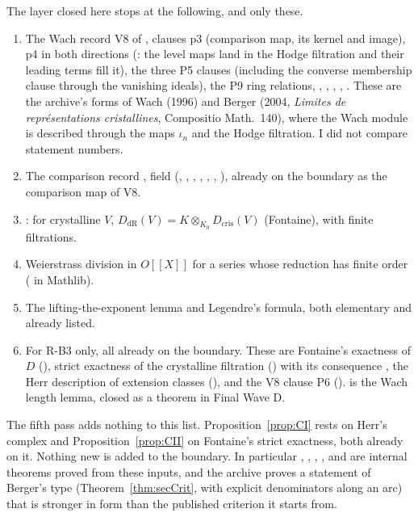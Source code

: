 \documentclass[11pt]{article}
\theoremstyle{definition}
\theoremstyle{remark}
\begin{document}
The layer closed here stops at the following, and only these.
\begin{enumerate}[leftmargin=*,itemsep=1pt]
\item The Wach record V8 of , clauses p3 (comparison map, its kernel and image), p4 in both directions (: the level maps land in the Hodge filtration and their leading terms fill it), the three P5 clauses (including the converse membership clause through the vanishing ideals), the P9 ring relations, , , , , . These are the archive's forms of Wach (1996) and Berger (2004, \emph{Limites de représentations cristallines}, Compositio Math.~140), where the Wach module is described through the maps $\iota_n$ and the Hodge filtration. I did not compare statement numbers.
\item The comparison record , field  (, , , , , , ), already on the boundary as the comparison map of V8.
\item {}: for crystalline $V$, $D_{\mathrm{dR}}(V)=K\otimes_{K_0}D_{\mathrm{cris}}(V)$ (Fontaine), with finite filtrations.
\item Weierstrass division in $O[[X]]$ for a series whose reduction has finite order ( in Mathlib).
\item The lifting-the-exponent lemma and Legendre's formula, both elementary and already listed.
\item For R-B3 only, all already on the boundary. These are Fontaine's exactness of $D$ (), strict exactness of the crystalline filtration () with its consequence , the Herr description of extension classes (), and the V8 clause P6 ().  is the Wach length lemma, closed as a theorem in Final Wave D.
\end{enumerate}
The fifth pass adds nothing to this list. Proposition~\ref{prop:CI} rests on Herr's complex and Proposition~\ref{prop:CII} on Fontaine's strict exactness, both already on it. Nothing new is added to the boundary. In particular , , , ,  and  are internal theorems proved from these inputs, and the archive proves a statement of Berger's type (Theorem~\ref{thm:secCrit}, with explicit denominators along an arc) that is stronger in form than the published criterion it starts from.
\end{document}
